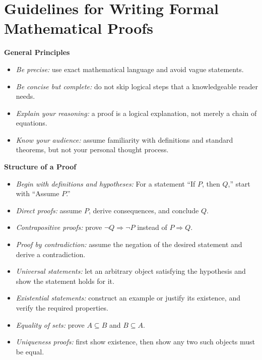 

\chapter{Guidelines for Writing Formal Mathematical Proofs}

\textbf{General Principles}

\begin{itemize}
    
	\item \emph{Be precise:} use exact mathematical language and avoid vague statements.
   
	\item \emph{Be concise but complete:} do not skip logical steps that a knowledgeable reader needs.
    
	\item \emph{Explain your reasoning:} a proof is a logical explanation, not merely a chain of equations.
    
	\item \emph{Know your audience:} assume familiarity with definitions and standard theorems, but not your personal thought process.

\end{itemize}

\textbf{Structure of a Proof}

\begin{itemize}

	\item \emph{Begin with definitions and hypotheses:}  
    For a statement ``If \(P\), then \(Q\),'' start with ``Assume \(P\).''

    \item \emph{Direct proofs:} assume \(P\), derive consequences, and conclude \(Q\).

    \item \emph{Contrapositive proofs:} prove \(\neg Q \Rightarrow \neg P\) instead of \(P \Rightarrow Q\).

    \item \emph{Proof by contradiction:} assume the negation of the desired statement and derive a contradiction.

    \item \emph{Universal statements:} let an arbitrary object satisfying the hypothesis and show the statement holds for it.

    \item \emph{Existential statements:} construct an example or justify its existence, and verify the required properties.

    \item \emph{Equality of sets:} prove \(A \subseteq B\) and \(B \subseteq A\).

    \item \emph{Uniqueness proofs:} first show existence, then show any two such objects must be equal.

\end{itemize}

